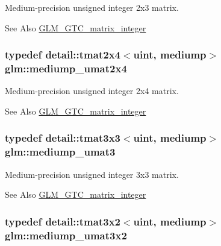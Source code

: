 Medium-\/precision unsigned integer 2x3 matrix. \begin{DoxySeeAlso}{See Also}
\hyperlink{group__gtc__matrix__integer}{G\-L\-M\-\_\-\-G\-T\-C\-\_\-matrix\-\_\-integer} 
\end{DoxySeeAlso}
\hypertarget{group__gtc__matrix__integer_gaf79e9c80f024d31f3d66ddae75e90b6c}{
\subsubsection[{mediump\-\_\-umat2x4}]{\setlength{\rightskip}{0pt plus 5cm}typedef detail\-::tmat2x4$<$uint, mediump$>$ {\bf glm\-::mediump\-\_\-umat2x4}}}\label{group__gtc__matrix__integer_gaf79e9c80f024d31f3d66ddae75e90b6c}
Medium-\/precision unsigned integer 2x4 matrix. \begin{DoxySeeAlso}{See Also}
\hyperlink{group__gtc__matrix__integer}{G\-L\-M\-\_\-\-G\-T\-C\-\_\-matrix\-\_\-integer} 
\end{DoxySeeAlso}
\hypertarget{group__gtc__matrix__integer_ga123f7d8bac8849e3a150bdf8a21e44a2}{
\subsubsection[{mediump\-\_\-umat3}]{\setlength{\rightskip}{0pt plus 5cm}typedef detail\-::tmat3x3$<$uint, mediump$>$ {\bf glm\-::mediump\-\_\-umat3}}}\label{group__gtc__matrix__integer_ga123f7d8bac8849e3a150bdf8a21e44a2}
Medium-\/precision unsigned integer 3x3 matrix. \begin{DoxySeeAlso}{See Also}
\hyperlink{group__gtc__matrix__integer}{G\-L\-M\-\_\-\-G\-T\-C\-\_\-matrix\-\_\-integer} 
\end{DoxySeeAlso}
\hypertarget{group__gtc__matrix__integer_ga65a9fdb1a5918fe6f308577065983e23}{
\subsubsection[{mediump\-\_\-umat3x2}]{\setlength{\rightskip}{0pt plus 5cm}typedef detail\-::tmat3x2$<$uint, mediump$>$ {\bf glm\-::mediump\-\_\-umat3x2}}}\label{group__gtc__matrix__integer_ga65a9fdb1a5918fe6f308577065983e23}
